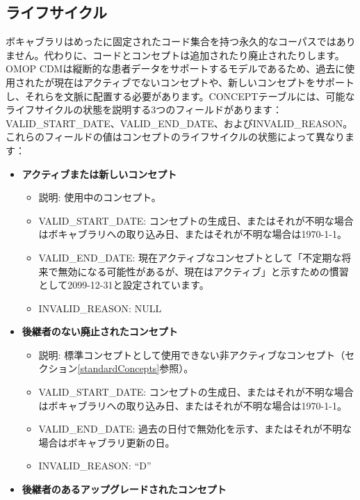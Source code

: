 \documentclass[
  11pt]{book}
\providecommand{\tightlist}{%
  \setlength{\itemsep}{0pt}\setlength{\parskip}{0pt}}
\theoremstyle{definition}
\theoremstyle{definition}
\theoremstyle{definition}
\theoremstyle{definition}
\theoremstyle{remark}
\begin{document}
\subsection{ライフサイクル}\label{conceptLifeCycle}

ボキャブラリはめったに固定されたコード集合を持つ永久的なコーパスではありません。代わりに、コードとコンセプトは追加されたり廃止されたりします。OMOP CDMは縦断的な患者データをサポートするモデルであるため、過去に使用されたが現在はアクティブでないコンセプトや、新しいコンセプトをサポートし、それらを文脈に配置する必要があります。CONCEPTテーブルには、可能なライフサイクルの状態を説明する3つのフィールドがあります：VALID\_START\_DATE、VALID\_END\_DATE、およびINVALID\_REASON。これらのフィールドの値はコンセプトのライフサイクルの状態によって異なります：

\begin{itemize}
\tightlist
\item
  \textbf{アクティブまたは新しいコンセプト}

  \begin{itemize}
  \tightlist
  \item
    説明: 使用中のコンセプト。
  \item
    VALID\_START\_DATE: コンセプトの生成日、またはそれが不明な場合はボキャブラリへの取り込み日、またはそれが不明な場合は1970-1-1。
  \item
    VALID\_END\_DATE: 現在アクティブなコンセプトとして「不定期な将来で無効になる可能性があるが、現在はアクティブ」と示すための慣習として2099-12-31と設定されています。
  \item
    INVALID\_REASON: NULL
  \end{itemize}
\item
  \textbf{後継者のない廃止されたコンセプト}

  \begin{itemize}
  \tightlist
  \item
    説明: 標準コンセプトとして使用できない非アクティブなコンセプト（セクション\ref{standardConcepts}参照）。
  \item
    VALID\_START\_DATE: コンセプトの生成日、またはそれが不明な場合はボキャブラリへの取り込み日、またはそれが不明な場合は1970-1-1。
  \item
    VALID\_END\_DATE: 過去の日付で無効化を示す、またはそれが不明な場合はボキャブラリ更新の日。
  \item
    INVALID\_REASON: ``D''
  \end{itemize}
\item
  \textbf{後継者のあるアップグレードされたコンセプト}


\end{itemize}
\end{document}
